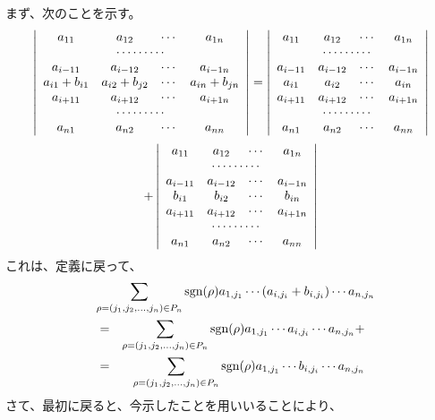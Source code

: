 \begin{enumerate}
\smallskip
\proof
まず、次のことを示す。
$$\left|\begin{array}{cccc}a_{11} & a_{12} & \cdots & a_{1n} \\
\multicolumn{4}{c}{\cdots\cdots\cdots}\\
a_{i-11} & a_{i-12} & \cdots & a_{i-1n}\\
a_{i1}+b_{i1} & a_{i2}+b_{j2} & \cdots & a_{in}+b_{jn}\\
a_{i+11} & a_{i+12} & \cdots & a_{i+1n}\\
\multicolumn{4}{c}{\cdots\cdots\cdots}\\
a_{n1} & a_{n2} & \cdots & a_{nn}
\end{array}\right| = 
\left|\begin{array}{cccc}a_{11} & a_{12} & \cdots & a_{1n} \\
\multicolumn{4}{c}{\cdots\cdots\cdots}\\
a_{i-11} & a_{i-12} & \cdots & a_{i-1n}\\
a_{i1} & a_{i2} & \cdots & a_{in}\\
a_{i+11} & a_{i+12} & \cdots & a_{i+1n}\\
\multicolumn{4}{c}{\cdots\cdots\cdots}\\
a_{n1} & a_{n2} & \cdots & a_{nn}
\end{array}\right| $$
$$+ 
\left|\begin{array}{cccc}a_{11} & a_{12} & \cdots & a_{1n} \\
\multicolumn{4}{c}{\cdots\cdots\cdots}\\
a_{i-11} & a_{i-12} & \cdots & a_{i-1n}\\
b_{i1} & b_{i2} & \cdots & b_{in}\\
a_{i+11} & a_{i+12} & \cdots & a_{i+1n}\\
\multicolumn{4}{c}{\cdots\cdots\cdots}\\
a_{n1} & a_{n2} & \cdots & a_{nn}
\end{array}\right| $$
これは、定義に戻って、
\begin{eqnarray*}
\lefteqn{\sum_{\rho = (j_1,j_2,\ldots,j_n)\in P_n} \sgn(\rho)a_{1,j_1}\cdots (a_{i,j_i} + b_{i,j_i}) \cdots a_{n,j_n}}\\
& = & \sum_{\rho = (j_1,j_2,\ldots,j_n)\in P_n} \sgn(\rho)a_{1,j_1}\cdots a_{i,j_i} \cdots a_{n,j_n} + \\
& = & \mbox{ } \sum_{\rho = (j_1,j_2,\ldots,j_n)\in P_n} \sgn(\rho)a_{1,j_1}\cdots b_{i,j_i} \cdots a_{n,j_n}
\end{eqnarray*}
さて、最初に戻ると、今示したことを用いいることにより、
\begin{eqnarray*}

\end{eqnarray*}
\end{enumerate}
